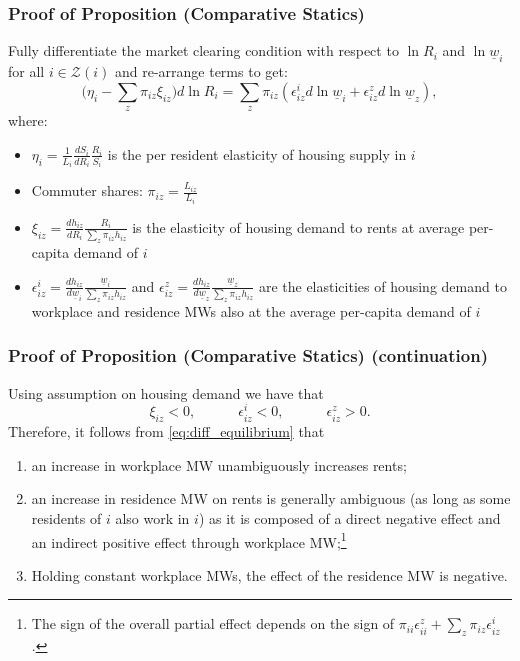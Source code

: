 \documentclass[aspectratio=169, t]{beamer}
\newcommand{\Z}{\mathcal{Z}}
\newcommand{\MW}{\underline{w}}
\begin{document}
\begin{frame}[label = proof_comp_stat]
\frametitle{Proof of Proposition (Comparative Statics)}

    Fully differentiate the market clearing condition with respect to $\ln R_i$ and 
    $\ln \MW_i$ for all $i\in\Z(i)$ and re-arrange terms to get:
    \begin{equation}\label{eq:diff_equilibrium}
        \Big(\eta_i - \sum_z \pi_{iz} \xi_{iz} \Big) d \ln R_i
        = 
        \sum_z \pi_{iz} \left(\epsilon_{iz}^i d \ln \MW_i 
                            + \epsilon_{iz}^z d \ln \MW_z \right) ,
    \end{equation}
    where:
    \begin{itemize}
        \item $\eta_i = \frac{1}{L_i} \frac{d S_i}{d R_i} \frac{R_i}{S_i}$ is the per resident elasticity 
        of housing supply in $i$
        \item Commuter shares: $\pi_{iz} = \frac{L_{iz}}{L_i}$
        \item $\xi_{iz} = \frac{d h_{iz}}{d R_i} \frac{R_i}{\sum_z \pi_{iz} h_{iz}}$ is the 
        elasticity of housing demand to rents at average per-capita demand of $i$
        \item  $\epsilon_{iz}^i = \frac{d h_{iz}}{d \MW_i} \frac{\MW_i}{\sum_z \pi_{iz} h_{iz}}$ and 
        $\epsilon_{iz}^z = \frac{d h_{iz}}{d \MW_z} \frac{\MW_z}{\sum_z \pi_{iz} h_{iz}}$ 
        are the elasticities of housing demand to workplace and residence MWs also at
         the average per-capita demand of $i$
    \end{itemize}
\end{frame}

\begin{frame}
    \frametitle{Proof of Proposition (Comparative Statics) (continuation)}
    
    Using assumption on housing demand we have that
    $$
	\xi_{iz} < 0, \quad\quad\quad \epsilon_{iz}^i < 0, \quad\quad\quad \epsilon_{iz}^z > 0 .
	$$
	\vspace{1mm}
    Therefore, it follows from \eqref{eq:diff_equilibrium} that
    \begin{enumerate}
        \item an increase in workplace MW unambiguously increases rents;
        \item an increase in residence MW on rents is generally ambiguous 
        (as long as some residents of $i$ also work in $i$) as it is composed of a direct negative 
        effect and an indirect positive effect through workplace MW;\footnote{The sign of the overall partial effect depends on the sign of 
    $\pi_{ii} \epsilon_{ii}^z + \sum_z \pi_{iz} \epsilon_{iz}^i$.}
        \item Holding constant workplace MWs, the effect of the residence MW is negative.
    \end{enumerate}    
\end{frame}
\end{document}
